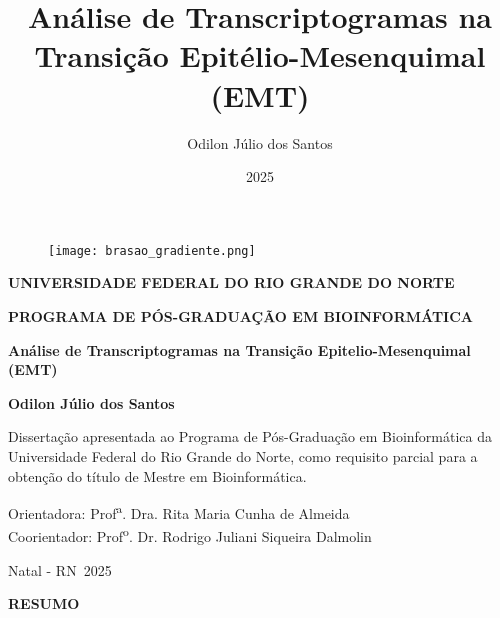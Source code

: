 \documentclass[12pt]{article}
\title{\textbf{Análise de Transcriptogramas na Transição Epitélio-Mesenquimal (EMT)}}
\author{Odilon Júlio dos Santos}
\date{2025}
\begin{document}
\begin{center}
\begin{figure}
    \centering
    \texttt{[image: brasao\_gradiente.png]}
\end{figure}
\textbf{UNIVERSIDADE FEDERAL DO RIO GRANDE DO NORTE}

\textbf{PROGRAMA DE PÓS-GRADUAÇÃO EM BIOINFORMÁTICA}

\vfill

\textbf{Análise de Transcriptogramas na Transição Epitelio-Mesenquimal (EMT)}

\vfill

\textbf{Odilon Júlio dos Santos}

\vfill

Dissertação apresentada ao Programa de Pós-Graduação em Bioinformática da Universidade Federal do Rio Grande do Norte, como requisito parcial para a obtenção do título de Mestre em Bioinformática.

\vfill

Orientadora: Prof\textsuperscript{a}. Dra. Rita Maria Cunha de Almeida\\
Coorientador: Prof\textsuperscript{o}. Dr. Rodrigo Juliani Siqueira Dalmolin

\vfill

Natal - RN\
2025

\end{center}

\newpage

\begin{center}
\textbf{RESUMO}
\end{center}
\end{document}

